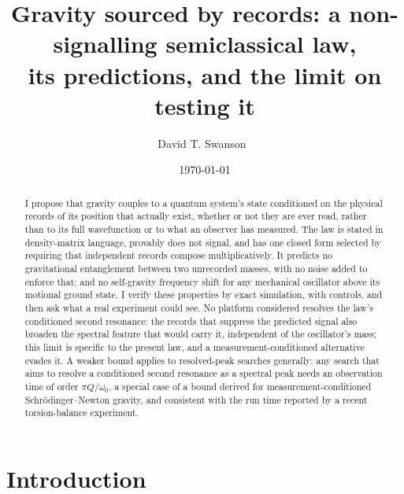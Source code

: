 \documentclass[aps,pra,reprint,amsmath,amssymb,superscriptaddress]{revtex4-2}
\begin{document}
\title{Gravity sourced by records: a non-signalling semiclassical law,\\
its predictions, and the limit on testing it}

\author{David T. Swanson~}
\noaffiliation

\date{\today}

\begin{abstract}
I propose that gravity couples to a quantum system's state conditioned on the
physical records of its position that actually exist, whether or not they are
ever read, rather than to its full wavefunction or to what an observer has
measured. The law is stated in density-matrix language, provably does not
signal, and has one closed form selected by requiring that independent records
compose multiplicatively. It predicts no gravitational entanglement between two
unrecorded masses, with no noise added to enforce that; and no self-gravity
frequency shift for any mechanical oscillator above its motional ground state.
I verify these properties by exact simulation, with controls, and then ask
what a real experiment could see. No platform considered resolves the law's
conditioned second resonance: the records that suppress the predicted signal
also broaden the spectral feature that would carry it, independent of the
oscillator's mass; this limit is specific to the present law, and a
measurement-conditioned alternative evades it. A weaker bound applies to
resolved-peak searches generally: any search that aims to resolve a
conditioned second resonance as a spectral peak needs an observation time of
order $\pi Q/\omega_0$, a special case of a bound derived for
measurement-conditioned Schr\"odinger--Newton gravity, and consistent with the
run time reported by a recent torsion-balance experiment.
\end{abstract}

\maketitle

\section{Introduction}
\end{document}
